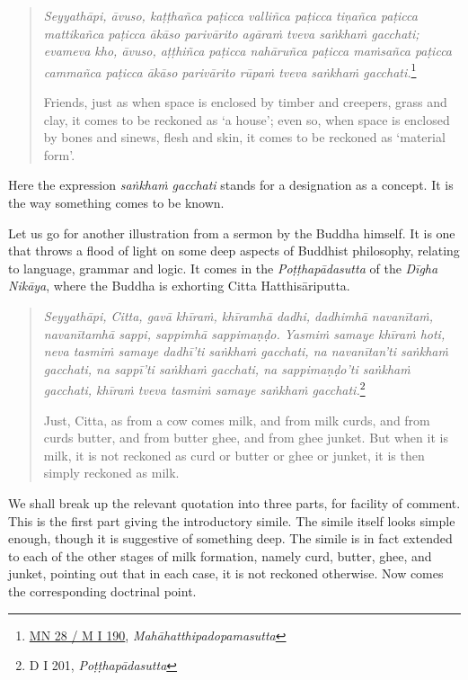 \begin{quote}
\emph{Seyyathāpi, āvuso, kaṭṭhañca paṭicca valliñca paṭicca tiṇañca paṭicca mattikañca paṭicca ākāso parivārito agāraṁ tveva saṅkhaṁ gacchati; evameva kho, āvuso, aṭṭhiñca paṭicca nahāruñca paṭicca maṁsañca paṭicca cammañca paṭicca ākāso parivārito rūpaṁ tveva saṅkhaṁ gacchati.}\footnote{\href{https://suttacentral.net/mn28/pli/ms}{MN 28 / M I 190}, \emph{Mahāhatthipadopamasutta}}

Friends, just as when space is enclosed by timber and creepers, grass and clay, it comes to be reckoned as `a house'; even so, when space is enclosed by bones and sinews, flesh and skin, it comes to be reckoned as `material form'.
\end{quote}

Here the expression \emph{saṅkhaṁ gacchati} stands for a designation as a concept. It is the way something comes to be known.

Let us go for another illustration from a sermon by the Buddha himself. It is one that throws a flood of light on some deep aspects of Buddhist philosophy, relating to language, grammar and logic. It comes in the \emph{Poṭṭhapādasutta} of the \emph{Dīgha Nikāya}, where the Buddha is exhorting Citta Hatthisāriputta.

\begin{quote}
\emph{Seyyathāpi, Citta, gavā khīraṁ, khīramhā dadhi, dadhimhā navanītaṁ, navanītamhā sappi, sappimhā sappimaṇḍo. Yasmiṁ samaye khīraṁ hoti, neva tasmiṁ samaye dadhī'ti saṅkhaṁ gacchati, na navanītan'ti saṅkhaṁ gacchati, na sappī'ti saṅkhaṁ gacchati, na sappimaṇḍo'ti saṅkhaṁ gacchati, khīraṁ tveva tasmiṁ samaye saṅkhaṁ gacchati.}\footnote{D I 201, \emph{Poṭṭhapādasutta}}

Just, Citta, as from a cow comes milk, and from milk curds, and from curds butter, and from butter ghee, and from ghee junket. But when it is milk, it is not reckoned as curd or butter or ghee or junket, it is then simply reckoned as milk.
\end{quote}

We shall break up the relevant quotation into three parts, for facility of comment. This is the first part giving the introductory simile. The simile itself looks simple enough, though it is suggestive of something deep. The simile is in fact extended to each of the other stages of milk formation, namely curd, butter, ghee, and junket, pointing out that in each case, it is not reckoned otherwise. Now comes the corresponding doctrinal point.

